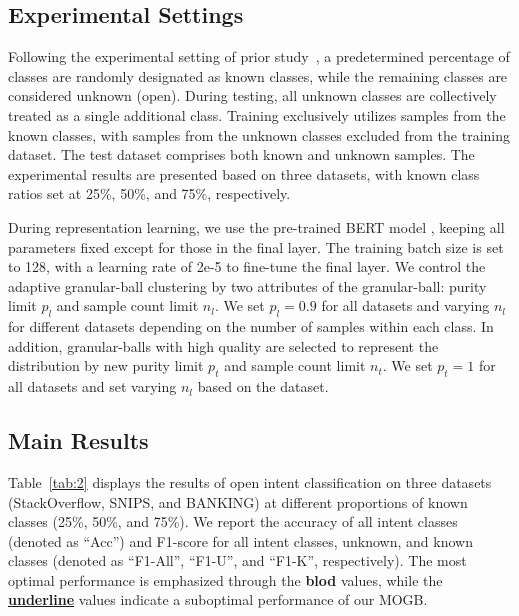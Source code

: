 \documentclass[letterpaper]{article} %
\theoremstyle{definition}
\begin{document}
\subsection{Experimental Settings}
Following the experimental setting of prior study~\cite{zhang2021deep}, a predetermined percentage of classes are randomly designated as known classes, while the remaining classes are considered unknown (open). During testing, all unknown classes are collectively treated as a single additional class. Training exclusively utilizes samples from the known classes, with samples from the unknown classes excluded from the training dataset. The test dataset comprises both known and unknown samples. The experimental results are presented based on three datasets, with known class ratios set at 25\%, 50\%, and 75\%, respectively.

During representation learning, we use the pre-trained BERT model \cite{kenton2019bert}, keeping all parameters fixed except for those in the final layer. The training batch size is set to 128, with a learning rate of 2e-5 to fine-tune the final layer. We control the adaptive granular-ball clustering by two attributes of the granular-ball: purity limit $p_l$ and sample count limit $n_l$. We set $p_l=0.9$ for all datasets and varying $n_l$ for different datasets depending on the number of samples within each class. In addition, granular-balls with high quality are selected to represent the distribution by new purity limit $p_t$ and sample count limit $n_t$. We set $p_t=1$ for all datasets and set varying $n_l$ based on the dataset.


\subsection{Main Results}

Table~\ref{tab:2} displays the results of open intent classification on three datasets (StackOverflow, SNIPS, and BANKING) at different proportions of known classes (25\%, 50\%, and 75\%). 
We report the accuracy of all intent classes (denoted as ``Acc'') and F1-score for all intent classes, unknown, and known classes (denoted as ``F1-All'', ``F1-U'', and ``F1-K'', respectively).
The most optimal performance is emphasized through the \textbf{blod} values, while the \underline{\textbf{underline}} values indicate a suboptimal performance of our MOGB.
\end{document}
